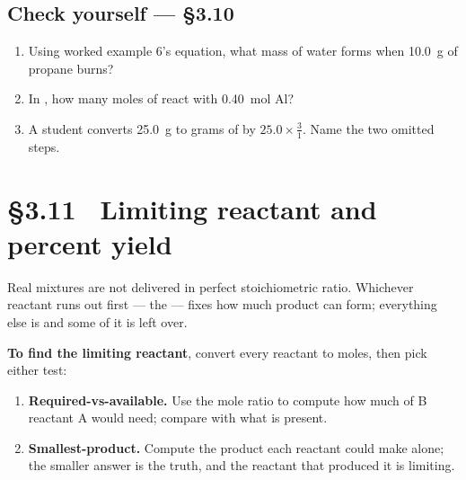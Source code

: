 \documentclass{apchem-worksheet}
\begin{document}
\subsection*{\sffamily Check yourself --- \S3.10}

\begin{enumerate}[leftmargin=*,itemsep=0.4em]
  \item Using worked example 6's equation, what mass of water forms when
        \SI{10.0}{\gram} of propane burns? \workspace[2.2cm]
  \item In , how many moles of  react
        with \SI{0.40}{\mole} Al? 
  \item A student converts \SI{25.0}{\gram}  to grams of
         by $25.0 \times \tfrac{3}{1}$. Name the two omitted
        steps. 
\end{enumerate}

\section*{\sffamily \S3.11 \textbullet\ Limiting reactant and percent
yield}

Real mixtures are not delivered in perfect stoichiometric ratio. Whichever
reactant runs out first --- the  --- fixes how much
product can form; everything else is  and some of it is
left over.

\textbf{To find the limiting reactant}, convert every reactant to moles,
then pick either test:

\begin{enumerate}[leftmargin=*,itemsep=0.2em]
  \item \textbf{Required-vs-available.} Use the mole ratio to compute how
        much of B reactant A would need; compare with what is present.
  \item \textbf{Smallest-product.} Compute the product each reactant could
        make alone; the smaller answer is the truth, and the reactant that
        produced it is limiting.
\end{enumerate}
\end{document}
